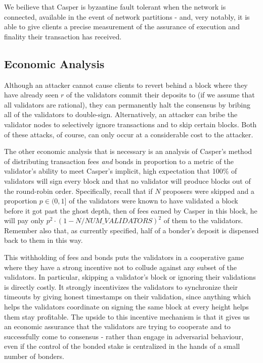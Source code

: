 \documentclass[11pt,a4paper]{article}
\begin{document}
We beilieve that Casper is byzantine fault tolerant when the network is connected, available in the event of network partitions - and, very notably, it is able to give clients a precise measurement of the assurance of execution and finality their transaction has received.


\subsection{Economic Analysis}

Although an attacker cannot cause clients to revert behind a block where they have already seen $r$ of the validators commit their deposits to (if we assume that all validators are rational), they can permanently halt the consensus by bribing all of the validators to double-sign. Alternatively, an attacker can bribe the validator nodes to selectively ignore transactions and to skip certain blocks. Both of these attacks, of course, can only occur at a considerable cost to the attacker.

The other economic analysis that is necessary is an analysis of Casper's method of distributing transaction fees \emph{and} bonds in proportion to a metric of the validator's ability to meet Casper's implicit, high expectation that 100\% of validators will sign every block and that no validator will produce blocks out of the round-robin order. Specifically, recall that if $N$ proposers were skipped and a proportion $p \in (0,1]$ of the validators were known to have validated a block before it got past the ghost depth, then of fees earned by Casper in this block, he will pay only $p^2 \cdot (1 - N/NUM\_VALIDATORS)^2$ of them to the validators. Remember also that, as currently specified, half of a bonder's deposit is dispensed back to them in this way.

This withholding of fees and bonds puts the validators in a cooperative game where they have a strong incentive not to collude against any subset of the validators. In particular, skipping a validator's block or ignoring their validations is directly costly. It strongly incentivizes the validators to synchronize their timeouts by giving honest timestamps on their validation, since anything which helps the validators coordinate on signing the same block at every height helps them stay profitable. The upside to this incentive mechanism is that it gives us an economic assurance that the validators are trying to cooperate and to successfully come to consensus - rather than engage in adversarial behaviour, even if the control of the bonded stake is centralized in the hands of a small number of bonders. 
\end{document}
